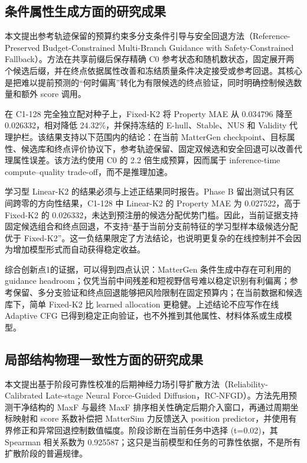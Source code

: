 \subsection{条件属性生成方面的研究成果}

本文提出参考轨迹保留的预算约束多分支条件引导与安全回退方法（Reference-Preserved Budget-Constrained Multi-Branch Guidance with Safety-Constrained Fallback）。方法在共享前缀后保存精确 C0 参考状态和随机数状态，固定展开两个候选后缀，并在终点依据属性改善和冻结质量条件决定接受或参考回退。其核心是把难以提前预测的``何时偏离''转化为有限候选的终点验证，同时明确控制候选数量和额外 score 调用。

在 C1-128 完全独立配对种子上，Fixed-K2 将 Property MAE 从 0.034796 降至 0.026332，相对降低 24.32\%，并保持冻结的 E-hull、Stable、NUS 和 Validity 代理护栏。该结果支持以下范围内的结论：在当前 MatterGen checkpoint、目标属性、候选库和终点评价协议下，参考轨迹保留、固定双候选和安全回退可以改善代理属性误差。该方法约使用 C0 的 2.2 倍生成预算，因而属于 inference-time compute--quality trade-off，而不是推理加速。

学习型 Linear-K2 的结果必须与上述正结果同时报告。Phase B 留出测试只有区间跨零的方向性结果，C1-128 中 Linear-K2 的 Property MAE 为 0.027522，高于 Fixed-K2 的 0.026332，未达到预注册的候选分配优势门槛。因此，当前证据支持固定候选组合和终点回退，不支持``基于当前分支前特征的学习型样本级候选分配优于 Fixed-K2''。这一负结果限定了方法结论，也说明更复杂的在线控制并不会因为增加模型形式而自动获得稳定收益。

综合创新点1的证据，可以得到四点认识：MatterGen 条件生成中存在可利用的 guidance headroom；仅凭当前中间残差和短视野信号难以稳定识别有利偏离；参考保留、多分支验证和终点回退能够把风险限制在固定预算内；在当前数据和候选库下，简单 Fixed-K2 比 learned allocation 更稳健。上述结论不应写作在线 Adaptive CFG 已得到稳定正向验证，也不外推到其他属性、材料体系或生成模型。

\subsection{局部结构物理一致性方面的研究成果}

本文提出基于阶段可靠性校准的后期神经力场引导扩散方法（Reliability-Calibrated Late-stage Neural Force-Guided Diffusion，RC-NFGD）。方法先用预测干净结构的 MaxF 与最终 MaxF 排序相关性确定后期介入窗口，再通过周期坐标映射和 score 系数补偿把 Matter\allowbreak Sim 力反馈送入 position predictor，并使用有界修正和异常回退控制数值幅度。阶段诊断在当前任务中选择 (t=0.02)，其 Spearman 相关系数为 0.925587；这只是当前模型和任务的可靠性依据，不是所有扩散阶段的普遍规律。


